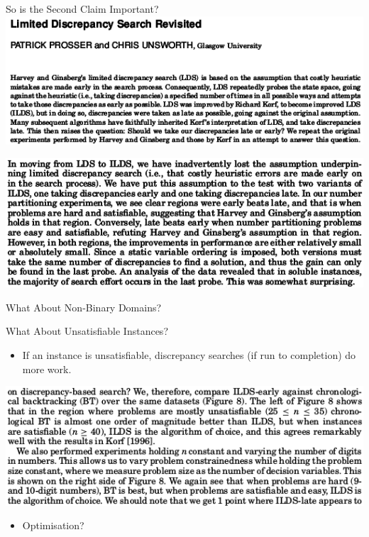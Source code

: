\documentclass{beamer}
\begin{document}
\begin{frame}{So is the Second Claim Important?}
    \centering\includegraphics*[keepaspectratio=true,scale=0.4]{ldsr-paper.png}

    \vspace{2em}

    \centering\includegraphics*[keepaspectratio=true,scale=0.4]{ldsr-conclusion.png}

    \vspace{0em}

\end{frame}

\begin{frame}{What About Non-Binary Domains?}
\end{frame}

\begin{frame}{What About Unsatisfiable Instances?}

    \begin{itemize}
        \item If an instance is unsatisfiable, discrepancy searches (if run to completion) do more
            work.
    \end{itemize}

    \vspace{1em}

    \centering\includegraphics*[keepaspectratio=true,scale=0.4]{ldsr-bt.png}

    \vspace{1em}

    \begin{itemize}
        \item Optimisation?
    \end{itemize}

\end{frame}
\end{document}
